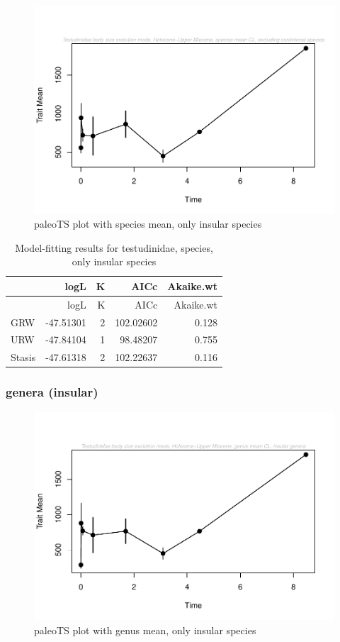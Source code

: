 \documentclass[]{article}
\begin{document}
\begin{figure}[htbp]
\centering
\includegraphics{MA_JJ_files/figure-latex/paleoTS plot with species mean, excluding continental species-1.pdf}
\caption{paleoTS plot with species mean, only insular species}
\end{figure}

\begin{longtable}[]{@{}lrrrr@{}}
\caption{Model-fitting results for testudinidae, species, only insular
species}\tabularnewline
\toprule
& logL & K & AICc & Akaike.wt\tabularnewline
\midrule
\endfirsthead
\toprule
& logL & K & AICc & Akaike.wt\tabularnewline
\midrule
\endhead
GRW & -47.51301 & 2 & 102.02602 & 0.128\tabularnewline
URW & -47.84104 & 1 & 98.48207 & 0.755\tabularnewline
Stasis & -47.61318 & 2 & 102.22637 & 0.116\tabularnewline
\bottomrule
\end{longtable}

\newpage

\subsubsection{genera (insular)}\label{genera-insular}

\begin{figure}[htbp]
\centering
\includegraphics{MA_JJ_files/figure-latex/paleoTS plot with genus mean, excluding continental species-1.pdf}
\caption{paleoTS plot with genus mean, only insular species}
\end{figure}
\end{document}
